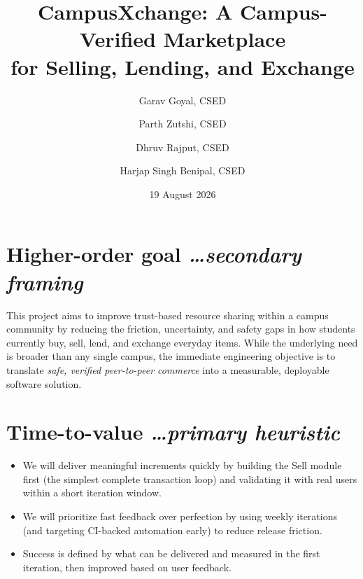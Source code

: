 \documentclass[11pt,a4paper]{article}
\title{CampusXchange: A Campus-Verified Marketplace\\ for Selling, Lending, and Exchange}
\author{
  Garav Goyal, CSED
  \and
  Parth Zutshi, CSED
  \and
  Dhruv Rajput, CSED
  \and
  Harjap Singh Benipal, CSED
}
\date{19 August 2026}
\newcommand{\BvrHint}[1]{%
  {\normalfont\normalsize\itshape\hfill #1}}
\begin{document}
\maketitle

\section{Higher-order goal%
  \BvrHint{\ldots secondary framing}}
This project aims to improve trust-based resource sharing within a campus
community by reducing the friction, uncertainty, and safety gaps in how
students currently buy, sell, lend, and exchange everyday items. While the
underlying need is broader than any single campus, the immediate engineering
objective is to translate \emph{safe, verified peer-to-peer commerce} into a
measurable, deployable software solution.

\section{Time-to-value %
\BvrHint{\ldots primary heuristic}}
\begin{itemize}[leftmargin=0.7cm]
    \item We will deliver meaningful increments quickly by building the Sell module first (the simplest complete transaction loop) and validating it with real users within a short iteration window.
    \item We will prioritize fast feedback over perfection by using weekly iterations (and targeting CI-backed automation early) to reduce release friction.
    \item Success is defined by what can be delivered and measured in the first iteration, then improved based on user feedback.
\end{itemize}
\end{document}
